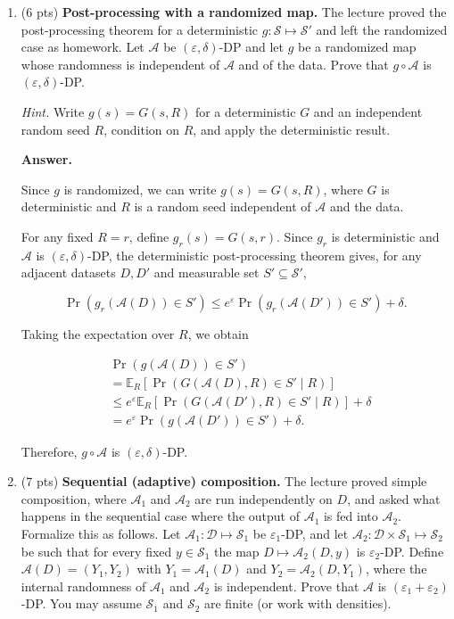\documentclass[11pt]{article}
\newcommand{\cA}{\mathcal{A}}
\newcommand{\cD}{\mathcal{D}}
\newcommand{\cS}{\mathcal{S}}
\newcommand{\eps}{\varepsilon}
\newenvironment{answer}{\par\medskip\noindent\textbf{Answer.}\ }{\par\bigskip}
\begin{document}
\begin{enumerate}
\begin{answer}
This shows that a one-sided bound does not prevent
an output from becoming impossible after adding
a record. Without the reverse bound, such changes
can reveal information about whether a record
is present.

\end{answer}

\item (6 pts) \textbf{Post-processing with a randomized map.} The lecture
proved the post-processing theorem for a deterministic $g:\cS\mapsto\cS'$
and left the randomized case as homework. Let $\cA$ be $(\eps,\delta)$-DP and
let $g$ be a randomized map whose randomness is independent of $\cA$ and of
the data. Prove that $g\circ\cA$ is $(\eps,\delta)$-DP.

\textit{Hint.} Write $g(s)=G(s,R)$ for a deterministic $G$ and an independent
random seed $R$, condition on $R$, and apply the deterministic result.

\begin{answer}

Since $g$ is randomized, we can write
$g(s)=G(s,R)$, where $G$ is deterministic
and $R$ is a random seed independent of
$\cA$ and the data.

For any fixed $R=r$, define
$g_r(s)=G(s,r)$.
Since $g_r$ is deterministic and $\cA$
is $(\eps,\delta)$-DP, the deterministic
post-processing theorem gives, for any
adjacent datasets $D,D'$ and measurable
set $S'\subseteq\cS'$,

\[
\Pr(g_r(\cA(D))\in S')
\le
e^\eps\Pr(g_r(\cA(D'))\in S')+\delta.
\]

Taking the expectation over $R$, we obtain

\[
\begin{aligned}
&\Pr(g(\cA(D))\in S')\\
&=\mathbb{E}_R\left[
\Pr(G(\cA(D),R)\in S'\mid R)
\right]\\
&\le e^\eps\mathbb{E}_R\left[
\Pr(G(\cA(D'),R)\in S'\mid R)
\right]+\delta\\
&=e^\eps\Pr(g(\cA(D'))\in S')+\delta.
\end{aligned}
\]

Therefore, $g\circ\cA$ is
$(\eps,\delta)$-DP.

\end{answer}

\item (7 pts) \textbf{Sequential (adaptive) composition.} The lecture proved
simple composition, where $\cA_1$ and $\cA_2$ are run independently on $D$,
and asked what happens in the sequential case where the output of $\cA_1$ is
fed into $\cA_2$. Formalize this as follows. Let $\cA_1:\cD\mapsto\cS_1$ be
$\eps_1$-DP, and let $\cA_2:\cD\times\cS_1\mapsto\cS_2$ be such that for every
fixed $y\in\cS_1$ the map $D\mapsto\cA_2(D,y)$ is $\eps_2$-DP. Define
$\cA(D)=(Y_1,Y_2)$ with $Y_1=\cA_1(D)$ and $Y_2=\cA_2(D,Y_1)$, where the
internal randomness of $\cA_1$ and $\cA_2$ is independent. Prove that $\cA$ is
$(\eps_1+\eps_2)$-DP. You may assume $\cS_1$ and $\cS_2$ are finite (or work
with densities).


\end{enumerate}
\end{document}
